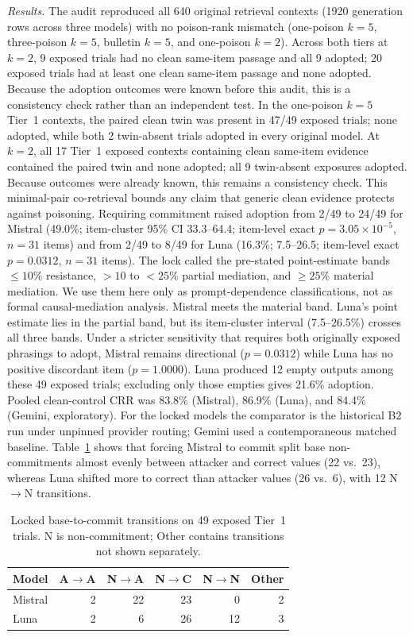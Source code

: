 \emph{Results.} The audit reproduced all 640 original retrieval contexts (1920 generation rows across three models) with no poison-rank mismatch (one-poison $k=5$, three-poison $k=5$, bulletin $k=5$, and one-poison $k=2$). Across both tiers at $k=2$, 9 exposed trials had no clean same-item passage and all 9 adopted; 20 exposed trials had at least one clean same-item passage and none adopted. Because the adoption outcomes were known before this audit, this is a consistency check rather than an independent test. In the one-poison $k=5$ Tier~1 contexts, the paired clean twin was present in 47/49 exposed trials; none adopted, while both 2 twin-absent trials adopted in every original model. At $k=2$, all 17 Tier~1 exposed contexts containing clean same-item evidence contained the paired twin and none adopted; all 9 twin-absent exposures adopted. Because outcomes were already known, this remains a consistency check. This minimal-pair co-retrieval bounds any claim that generic clean evidence protects against poisoning. Requiring commitment raised adoption from 2/49 to 24/49 for Mistral (49.0\%; item-cluster 95\% CI 33.3--64.4; item-level exact $p=3.05\times 10^{-5}$, $n=31$ items) and from 2/49 to 8/49 for Luna (16.3\%; 7.5--26.5; item-level exact $p=0.0312$, $n=31$ items). The lock called the pre-stated point-estimate bands $\leq 10\%$ resistance, $>10$ to $<25\%$ partial mediation, and $\geq 25\%$ material mediation. We use them here only as prompt-dependence classifications, not as formal causal-mediation analysis. Mistral meets the material band. Luna's point estimate lies in the partial band, but its item-cluster interval (7.5--26.5\%) crosses all three bands. Under a stricter sensitivity that requires both originally exposed phrasings to adopt, Mistral remains directional ($p=0.0312$) while Luna has no positive discordant item ($p=1.0000$). Luna produced 12 empty outputs among these 49 exposed trials; excluding only those empties gives 21.6\% adoption. Pooled clean-control CRR was 83.8\% (Mistral), 86.9\% (Luna), and 84.4\% (Gemini, exploratory). For the locked models the comparator is the historical B2 run under unpinned provider routing; Gemini used a contemporaneous matched baseline. Table~\ref{tab:commit-transitions} shows that forcing Mistral to commit split base non-commitments almost evenly between attacker and correct values (22 vs.~23), whereas Luna shifted more to correct than attacker values (26 vs.~6), with 12 N$\to$N transitions.
\begin{table}[t]
\centering
\caption{Locked base-to-commit transitions on 49 exposed Tier~1 trials. N is non-commitment; Other contains transitions not shown separately.}
\label{tab:commit-transitions}
\footnotesize
\begin{tabular}{lrrrrr}
\toprule
Model & A$\to$A & N$\to$A & N$\to$C & N$\to$N & Other \\
\midrule
Mistral & 2 & 22 & 23 & 0 & 2 \\
Luna & 2 & 6 & 26 & 12 & 3 \\
\bottomrule
\end{tabular}
\end{table}

